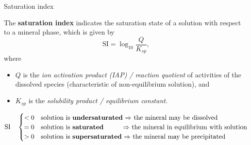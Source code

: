 %
%
\begin{frame}{Saturation index}

The \alert{\textbf{saturation index}} indicates the saturation state of
a solution with respect to a mineral phase, which is given by
%
\[
\boxed{ \mathrm{SI} = \log_{10} \frac{Q}{K_{sp}}},
\] 
where 
\begin{itemize}
\item $Q$ is the \emph{ion activation product (IAP) / reaction quotient} of activities of the dissolved species (characteristic of non-equilibrium solution), 
and 
\item $K_{sp}$ is the \emph{solubility product / equilibrium constant}. 
\end{itemize}
%
\[
\mathrm{SI} \quad 
\begin{cases}
< 0& \mbox{solution is \textbf{undersaturated} $\Rightarrow$ the mineral may be dissolved }\\
= 0& \mbox{solution is \textbf{saturated} \qquad \; $\Rightarrow$ the mineral in equilibrium with solution}\\
> 0 & \mbox{solution is \textbf{supersaturated} $\Rightarrow$ the mineral may be precipitated}
\end{cases}
\]
%

\end{frame}
%
%
